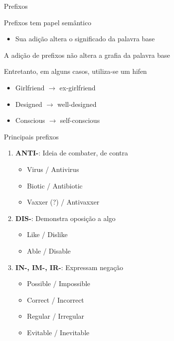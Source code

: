 \documentclass[compress,mathserif,xcolor=table]{beamer}
\begin{document}

\begin{frame}{Prefixos}

Prefixos tem papel semântico
\begin{itemize}
    \item Sua adição altera o significado da palavra base
\end{itemize}

\vspace{0.5cm}

A adição de prefixos não altera a grafia da palavra base

\vspace{0.5cm}

Entretanto, em alguns casos, utiliza-se um hifen
\begin{itemize}
    \item Girlfriend $\rightarrow$ ex-girlfriend
    \item Designed $\rightarrow$ well-designed
    \item Conscious $\rightarrow$ self-conscious
\end{itemize}
\end{frame}


\begin{frame}{Principais prefixos}

\begin{enumerate}
    \item \textbf{ANTI-}: Ideia de combater, de contra
    \begin{itemize}
        \item Virus / Antivirus
        \item Biotic / Antibiotic
        \item Vaxxer (?) / Antivaxxer
    \end{itemize}
    \vspace{1cm}
    \item \textbf{DIS-}: Demonstra oposição a algo
    \begin{itemize}
        \item Like / Dislike
        \item Able / Disable
    \end{itemize}
    \vspace{1cm}
    \item \textbf{IN-, IM-, IR-}: Expressam negação
    \begin{itemize}
        \item Possible / Impossible
        \item Correct / Incorrect
        \item Regular / Irregular
        \item Evitable / Inevitable
    \end{itemize}
\end{enumerate}
\end{frame}
\end{document}
